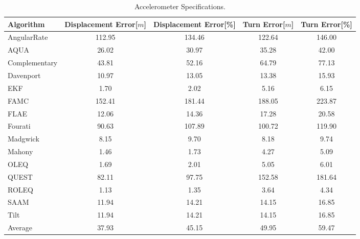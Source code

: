 \begin{table}[H]
    \begin{center}
        \begin{tabular}[t]{lcccc}
            \hline
            Algorithm                   & Displacement Error[$m$] & Displacement Error[\%]      & Turn Error[$m$]  & Turn Error[\%]             \\
            \hline 
            AngularRate            & 112.95  & 134.46 & 122.64 & 146.00              \\            AQUA            & 26.02  & 30.97 & 35.28 & 42.00              \\            Complementary            & 43.81  & 52.16 & 64.79 & 77.13              \\            Davenport            & 10.97  & 13.05 & 13.38 & 15.93              \\            EKF            & 1.70  & 2.02 & 5.16 & 6.15              \\            FAMC            & 152.41  & 181.44 & 188.05 & 223.87              \\            FLAE            & 12.06  & 14.36 & 17.28 & 20.58              \\            Fourati            & 90.63  & 107.89 & 100.72 & 119.90              \\            Madgwick            & 8.15  & 9.70 & 8.18 & 9.74              \\            Mahony            & 1.46  & 1.73 & 4.27 & 5.09              \\            OLEQ            & 1.69  & 2.01 & 5.05 & 6.01              \\            QUEST            & 82.11  & 97.75 & 152.58 & 181.64              \\            ROLEQ            & 1.13  & 1.35 & 3.64 & 4.34              \\            SAAM            & 11.94  & 14.21 & 14.15 & 16.85              \\            Tilt            & 11.94  & 14.21 & 14.15 & 16.85              \\
            \hline
            Average & 37.93 & 45.15 & 49.95 & 59.47
        \end{tabular}
        \caption{Accelerometer Specifications. }
        \label{tab:accelerometer_specification}
    \end{center}
\end{table}